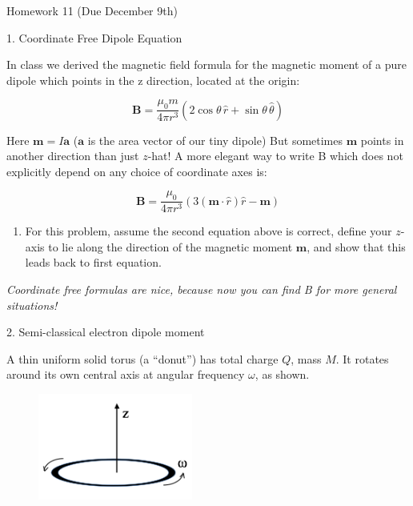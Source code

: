 \documentclass[11pt]{article}
\def\tightlist{}
\begin{document}
{\LARGE Homework 11 (Due December
9th)}\label{homework-11-due-december-9th}

{\Large 1. Coordinate Free Dipole
Equation}\label{coordinate-free-dipole-equation}

In class we derived the magnetic field formula for the magnetic moment
of a pure dipole which points in the z direction, located at the origin:

\[\mathbf{B} = \dfrac{\mu_0 m}{4 \pi r^3}(2 \cos \theta\,\hat{r} + \sin \theta\,\hat{\theta})\]

Here \(\mathbf{m}=I\mathbf{a}\) (\(\mathbf{a}\) is the area vector of
our tiny dipole) But sometimes \(\mathbf{m}\) points in another
direction than just \(z\)-hat! A more elegant way to write B which does
not explicitly depend on any choice of coordinate axes is:

\[\mathbf{B} = \dfrac{\mu_0}{4 \pi r^3}(3 (\mathbf{m}\cdot\hat{r})\hat{r} - \mathbf{m})\]

\begin{enumerate}
\def\labelenumi{\arabic{enumi}.}
\tightlist
\item
  For this problem, assume the second equation above is correct, define
  your \(z\)-axis to lie along the direction of the magnetic moment
  \(\mathbf{m}\), and show that this leads back to first equation.
\end{enumerate}

\emph{Coordinate free formulas are nice, because now you can find B for
more general situations!}

{\Large 2. Semi-classical electron dipole
moment}\label{semi-classical-electron-dipole-moment}

A thin uniform solid torus (a ``donut'') has total charge \(Q\), mass
\(M\). It rotates around its own central axis at angular frequency
\(\omega\), as shown.

\begin{figure}[htbp]
\centering
\includegraphics[width=2in]{./images/hw11/spinning_donut.png}
\end{figure}
\end{document}
